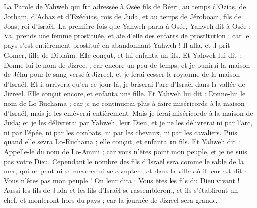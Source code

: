 \begin{multicols}{2}
\VerseOne{}La Parole de Yahweh qui fut adressée à Osée fils de Béeri, au temps d'Ozias, de Jotham, d'Achaz et d'Ezéchias, rois de Juda, et au temps de Jéroboam, fils de Joas, roi d'Israël.
La première fois que Yahweh parla à Osée, Yahweh dit à Osée : Va, prends une femme prostituée, et aie d'elle des enfants de prostitution ; car le pays s'est entièrement prostitué en abandonnant Yahweh !
Il alla, et il prit Gomer, fille de Diblaïm. Elle conçut, et lui enfanta un fils.
Et Yahweh lui dit : Donne-lui le nom de Jizreel ; car encore un peu de temps, et je punirai la maison de Jéhu pour le sang versé à Jizreel, et je ferai cesser le royaume de la maison d'Israël.
Et il arrivera qu'en ce jour-là, je briserai l'arc d'Israël dans la vallée de Jizreel.
Elle conçut encore, et enfanta une fille. Et Yahweh lui dit : Donne-lui le nom de Lo-Ruchama  ; car je ne continuerai plus à faire miséricorde à la maison d'Israël, mais je les enlèverai entièrement.
Mais je ferai miséricorde à la maison de Juda; et je les délivrerai par Yahweh, leur Dieu, et je ne les délivrerai ni par l'arc, ni par l'épée, ni par les combats, ni par les chevaux, ni par les cavaliers.
Puis quand elle sevra Lo-Ruchama ; elle conçut, et enfanta un fils.
Et Yahweh dit : Appelle-le du nom de Lo-Ammi ; car vous n'êtes point mon peuple, et je ne suis pas votre Dieu.
\VerseOne{}Cependant le nombre des fils d'Israël sera comme le sable de la mer, qui ne peut ni se mesurer ni se compter ; et dans la ville où il leur est dit : Vous n'êtes pas mon peuple ! On leur dira : Vous êtes les fils du Dieu vivant !
Aussi les fils de Juda et les fils d'Israël se rassembleront, et ils s'établiront un chef, et monteront hors du pays ; car la journée de Jizreel sera grande.

\end{multicols}
